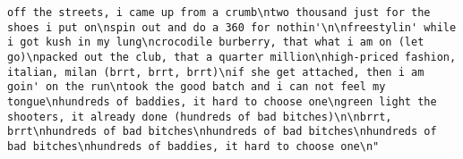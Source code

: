 \documentclass[]{article}
\begin{document}
\begin{verbatim}
off the streets, i came up from a crumb\ntwo thousand just for the shoes i put on\nspin out and do a 360 for nothin'\n\nfreestylin' while i got kush in my lung\ncrocodile burberry, that what i am on (let go)\npacked out the club, that a quarter million\nhigh-priced fashion, italian, milan (brrt, brrt, brrt)\nif she get attached, then i am goin' on the run\ntook the good batch and i can not feel my tongue\nhundreds of baddies, it hard to choose one\ngreen light the shooters, it already done (hundreds of bad bitches)\n\nbrrt, brrt\nhundreds of bad bitches\nhundreds of bad bitches\nhundreds of bad bitches\nhundreds of baddies, it hard to choose one\n"                                                                                                                                                                                                                                                                                                                                                                                                                                                                                                                                                                                                                                                                                                                                                                                                                                                                                                                                                                                                                                                                                                                                                                                                                                                                                                                                                                                                                                                                                                                                                                                                                                                                                                                                                                                                                                                                                                                                                                                                                                                                                                                                                                                                                                                                                                                

\end{verbatim}
\end{document}

